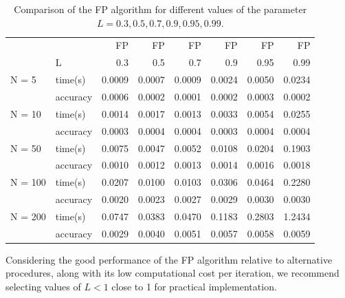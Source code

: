 \documentclass[preprint,11pt,authoryear]{elsarticle}
\begin{document}
\begin{table}[!h]
  \centering
  \caption{Comparison of the FP algorithm for different values of the parameter $L = 0.3, 0.5, 0.7, 0.9, 0.95, 0.99$.}
    \begin{tabular}{|l|l|r|r|r|r|r|r|}
		\hline
          &       & FP & FP & FP & FP & FP & FP \\
					&   L    & 0.3 & 0.5 & 0.7 & 0.9 & 0.95 & 0.99 \\
					\hline
					\hline
    N = 5 & time(s)  & 0.0009 & 0.0007 & 0.0009 & 0.0024 & 0.0050 & 0.0234 \\
          & accuracy & 0.0006 & 0.0002 & 0.0001 & 0.0002 & 0.0003 & 0.0002 \\
					\hline
    N = 10 & time(s)  & 0.0014 & 0.0017 & 0.0013 & 0.0033 & 0.0054 & 0.0255 \\
          & accuracy & 0.0003 & 0.0004 & 0.0004 & 0.0003 & 0.0004 & 0.0004 \\
					\hline
    N = 50 & time(s)  & 0.0075 & 0.0047 & 0.0052 & 0.0108 & 0.0204 & 0.1903 \\
          & accuracy & 0.0010 & 0.0012 & 0.0013 & 0.0014 & 0.0016 & 0.0018 \\
					\hline
    N = 100 & time(s)  & 0.0207 & 0.0100 & 0.0103 & 0.0306 & 0.0464 & 0.2280 \\
          & accuracy & 0.0020 & 0.0023 & 0.0027 & 0.0029 & 0.0030 & 0.0030 \\
					\hline
    N = 200 & time(s)  & 0.0747 & 0.0383 & 0.0470 & 0.1183 & 0.2803 & 1.2434 \\
          & accuracy & 0.0029 & 0.0040 & 0.0051 & 0.0057 & 0.0058 & 0.0059 \\
					\hline
    \end{tabular}%
  \label{tab2}%
\end{table}%
Considering the good performance of the FP algorithm relative to alternative procedures, along with its low computational cost per iteration, we recommend selecting values of $L < 1$ close to 1 for practical implementation.
 

       
\end{document}

